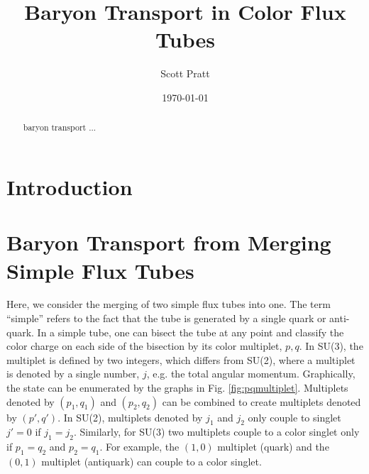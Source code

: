 \documentclass[aps, prc, 12pt, nofootinbib, showpacs, superscriptaddress, tightenlines, groupedaddress]{revtex4-2}
\begin{document}
\title{Baryon Transport in Color Flux Tubes}
\author{Scott Pratt}
\date{\today}

\pacs{}

\begin{abstract}
baryon transport ...
\end{abstract}

\maketitle

\section{Introduction}

\section{Baryon Transport from Merging Simple Flux Tubes}

Here, we consider the merging of two simple flux tubes into one. The term ``simple'' refers to the fact that the tube is generated by a single quark or anti-quark. In a simple tube, one can bisect the tube at any point and classify the color charge on each side of the bisection by its color multiplet, $p,q$. In SU(3), the multiplet is defined by two integers, which differs from SU(2), where a multiplet is denoted by a single number, $j$, e.g. the total angular momentum. Graphically, the state can be enumerated by the graphs in Fig. \ref{fig:pqmultiplet}. Multiplets denoted by $(p_1,q_1)$ and $(p_2,q_2)$ can be combined to create multiplets denoted by $(p',q')$. In SU(2), multiplets denoted by $j_1$ and $j_2$ only couple to singlet $j'=0$ if $j_1=j_2$. Similarly, for SU(3) two multiplets couple to a color singlet only if $p_1=q_2$ and $p_2=q_1$. For example, the $(1,0)$ multiplet (quark) and the $(0,1)$ multiplet (antiquark) can couple to a color singlet.
\end{document}
